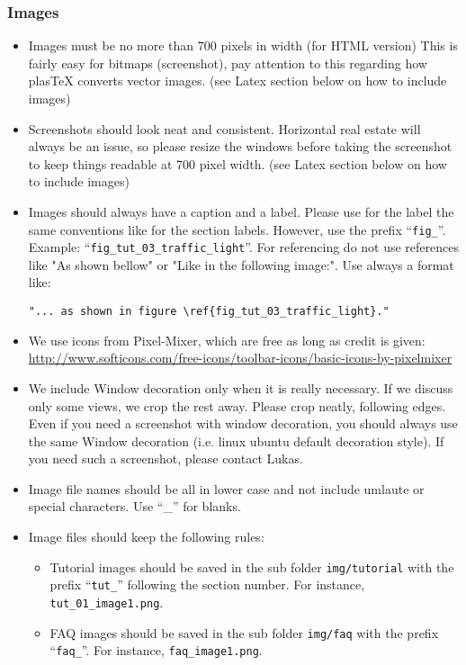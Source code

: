 \subsubsection{Images}
\begin{itemize}
	\item Images must be no more than 700 pixels in width (for HTML version)  This is fairly easy for bitmaps (screenshot), pay attention to this regarding how plasTeX converts vector images. (see Latex section below on how to include images)

    \item Screenshots should look neat and consistent.  Horizontal real estate will always be an issue, so please resize the windows before taking the screenshot to keep things readable at 700 pixel width.  (see Latex section below on how to include images)

	\item Images should always have a caption and a label. Please use for the label the same conventions like for the section labels. However, use the prefix ``\texttt{fig\_}''. Example: ``\texttt{fig\_tut\_03\_traffic\_light}''. For referencing do not use references like "As shown bellow" or "Like in the following image:". Use always a format like:

\begin{verbatim}"... as shown in figure \ref{fig_tut_03_traffic_light}."\end{verbatim}

	\item We use icons from Pixel-Mixer, which are free as long as credit is given: \url{http://www.softicons.com/free-icons/toolbar-icons/basic-icons-by-pixelmixer}

  \item We include Window decoration only when it is really necessary.  If we discuss only some views, we crop the rest away.  Please crop neatly, following edges. Even if you need a screenshot with window decoration, you should always use the same Window decoration (i.e. linux ubuntu default decoration style). If you need such a screenshot, please contact Lukas.

  \item Image file names should be all in lower case and not include umlaute or special characters. Use ``\_'' for blanks.

  \item Image files should keep the following rules:
	
\begin{itemize}
		\item Tutorial images should be saved in the sub folder \texttt{img/tutorial} with the prefix ``\texttt{tut\_}'' following the section number. For instance, \texttt{tut\_01\_image1.png}.

		\item FAQ images should be saved in the sub folder \texttt{img/faq} with the prefix ``\texttt{faq\_}''. For instance, \texttt{faq\_image1.png}.

	\end{itemize} 
	\end{itemize}

